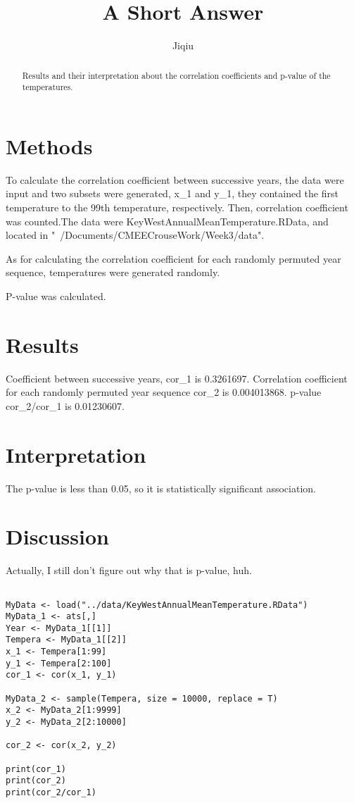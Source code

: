 \documentclass[12pt]{article}
\title{A Short Answer}
\author{Jiqiu}
\date{}
\begin{document}
  \maketitle

  \begin{abstract}
    Results and their interpretation about the correlation coefficients and p-value of the temperatures.
  \end{abstract}

  \section{Methods}
  To calculate the correlation coefficient between successive years, the data were input and two subsets were generated, x_1 and y_1, they contained the first temperature to the 99th temperature, respectively. Then, correlation coefficient was counted.The data were KeyWestAnnualMeanTemperature.RData, and located in "~/Documents/CMEECrouseWork/Week3/data". 
  
  As for calculating the correlation coefficient for each randomly permuted year sequence, temperatures were generated randomly.

  P-value was calculated.

  \section{Results}
  Coefficient between successive years, cor_1 is 0.3261697. Correlation coefficient for each randomly permuted year sequence cor_2 is 0.004013868. p-value cor_2/cor_1 is 0.01230607.

  \section{Interpretation}
  The p-value is less than 0.05, so it is statistically significant association.
  
  \section{Discussion}
  Actually, I still don't figure out why that is p-value, huh.
  


\begin{colorboxed}
\begin{lstlisting}

MyData <- load("../data/KeyWestAnnualMeanTemperature.RData")
MyData_1 <- ats[,]
Year <- MyData_1[[1]]
Tempera <- MyData_1[[2]]
x_1 <- Tempera[1:99]
y_1 <- Tempera[2:100]
cor_1 <- cor(x_1, y_1)

MyData_2 <- sample(Tempera, size = 10000, replace = T)
x_2 <- MyData_2[1:9999]
y_2 <- MyData_2[2:10000]

cor_2 <- cor(x_2, y_2)

print(cor_1)
print(cor_2)
print(cor_2/cor_1)
\end{lstlisting}
\end{colorboxed}
\end{document}
